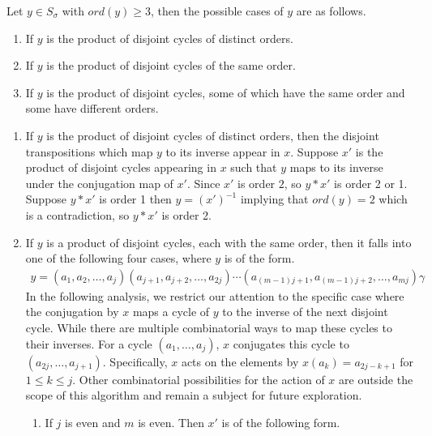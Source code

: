\documentclass[oneside]{amsart}
\theoremstyle{plain}
\theoremstyle{definition}
\theoremstyle{remark}
\newcommand{\ord}{ord}
\begin{document}
            Let $y \in S_{\sigma}$ with $\ord(y) \geq 3$, then the possible cases of $y$ are as follows.
            \begin{enumerate}
                \item If $y$ is the product of disjoint cycles of distinct orders.
                \item If $y$ is the product of disjoint cycles of the same order.
                \item If $y$ is the product of disjoint cycles, some of which have the same order and some have different orders.
            \end{enumerate}
            \begin{enumerate}
                \item[Case (1).] If $y$ is the product of disjoint cycles of distinct orders, then the disjoint transpositions which map $y$ to its inverse appear in $x$. Suppose $x'$ is the product of disjoint cycles appearing in $x$ such that $y$ maps to its inverse under the conjugation map of $x'$. Since $x'$ is order $2$, so $y*x'$ is order 2 or 1. Suppose $y*x'$ is order 1 then $y = (x')^{-1}$ implying that $\ord(y) = 2$ which is a contradiction, so $y*x'$ is order 2.
                \item[Case (2).] If $y$ is a product of disjoint cycles, each with the same order, then it falls into one of the following four cases, where $y$ is of the form.
                \begin{align*}
                    y = (a_1, a_2, \ldots, a_j)(a_{j + 1}, a_{j + 2}, \ldots, a_{2j})\cdots(a_{(m - 1)j + 1},a_{(m - 1)j + 2}, \ldots, a_{mj}) \gamma
                \end{align*}
                In the following analysis, we restrict our attention to the specific case where the conjugation by $x$ maps a cycle of $y$ to the inverse of the next disjoint cycle. While there are multiple combinatorial ways to map these cycles to their inverses. For a cycle $(a_1, \ldots, a_j)$, $x$ conjugates this cycle to $(a_{2j}, \ldots, a_{j+1})$. Specifically, $x$ acts on the elements by $x(a_k) = a_{2j-k+1}$ for $1 \leq k \leq j$. Other combinatorial possibilities for the action of $x$ are outside the scope of this algorithm and remain a subject for future exploration.
                \begin{enumerate}
                    \item If $j$ is even and $m$ is even. Then $x'$ is of the following form.
                    \begin{align*}

\end{align*}
\end{enumerate}
\end{enumerate}
\end{document}
